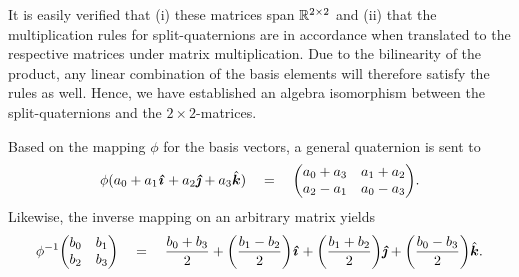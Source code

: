 It is easily verified that (i) these matrices span $\mathbb{R}^{2\times2}$ and (ii) that the multiplication rules for split-quaternions are in accordance when translated to the respective matrices under matrix multiplication. Due to the bilinearity of the product, any linear combination of the basis elements will therefore satisfy the rules as well. Hence, we have established an algebra isomorphism between the split-quaternions and the $2\times 2$-matrices. 

Based on the mapping $\phi$ for the basis vectors, a general quaternion is sent to 
\begin{equation}
    \phi(\quat{a_0}{a_1}{a_2}{a_3}) \quad = \quad \mqty(a_0 + a_3 & a_1 + a_2 \\ a_2 - a_1 & a_0 - a_3). 
    \label{eq:quat_isom}
\end{equation}
Likewise, the inverse mapping on an arbitrary matrix yields
\begin{equation}
    \phi^{-1}\mqty(b_0 & b_1 \\ b_2 & b_3) \quad = \quad \quat{\frac{b_0 + b_3}{2}}{\qty(\frac{b_1 - b_2}{2})}{\qty(\frac{b_1 + b_2}{2})}{\qty(\frac{b_0 - b_3}{2})}. 
    \label{eq:inv_quat_isom}
\end{equation}

